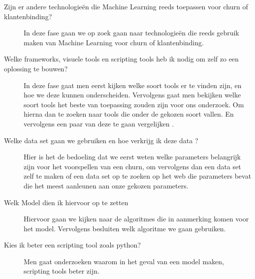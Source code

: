 \begin{description}
	\item [Zijn er andere technologieën die Machine Learning reeds toepassen voor churn of klantenbinding?] In deze fase gaan we op zoek gaan naar technologieën die reeds gebruik maken van Machine Learning voor churn of klantenbinding. 
	\item [Welke frameworks, visuele tools en scripting tools heb ik nodig om zelf zo een oplossing te bouwen?] In deze fase gaat men eerst kijken welke soort tools er te vinden zijn, en hoe we deze kunnen onderscheiden. Vervolgens gaat men bekijken welke soort tools het beste van toepassing zouden zijn voor ons onderzoek. Om hierna dan te zoeken naar tools die onder de gekozen soort vallen. En vervolgens een paar van deze te gaan vergelijken .
	\item [Welke data set gaan we gebruiken en hoe verkrijg ik deze data ?] Hier is het de bedoeling dat we eerst weten welke parameters belangrijk zijn voor het voorspellen van een churn, om vervolgens dan een data set zelf te maken of een data set op te zoeken op het web die parameters bevat die het meest aanleunen aan onze gekozen parameters.
	\item [Welk Model dien ik hiervoor op te zetten]Hiervoor gaan we kijken naar de algoritmes die in aanmerking komen voor het model. Vervolgens besluiten welk algoritme we gaan gebruiken.
	\item [Kies ik beter een scripting tool zoals python?]Men gaat onderzoeken waarom in het geval van een model maken, scripting tools beter zijn.
\end{description}

